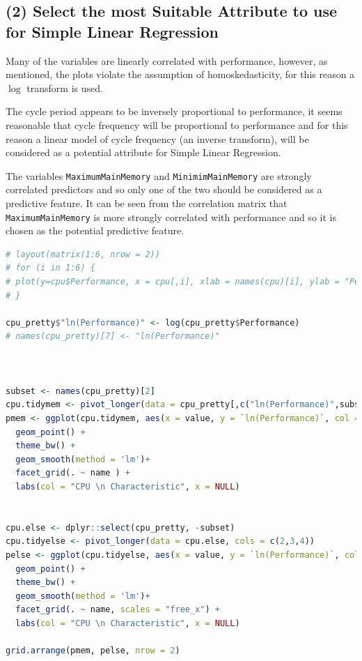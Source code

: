 \documentclass[
]{article}
\newcommand{\passthrough}[1]{#1}
\begin{document}
\hypertarget{select-the-most-suitable-attribute-to-use-for-simple-linear-regression}{%
\subsection{(2) Select the most Suitable Attribute to use for Simple
Linear
Regression}\label{select-the-most-suitable-attribute-to-use-for-simple-linear-regression}}

Many of the variables are linearly correlated with performance, however,
as mentioned, the plots violate the assumption of homoskedasticity, for
this reason a \(\log\) transform is used.

The cycle period appears to be inversely proportional to performance, it
seems reasonable that cycle frequency will be proportional to
performance and for this reason a linear model of cycle frequency
(an inverse transform), will be considered as a potential attribute for
Simple Linear Regression.

The variables \passthrough{\lstinline!MaximumMainMemory!} and
\passthrough{\lstinline!MinimimMainMemory!} are strongly correlated
predictors and so only one of the two should be considered as a
predictive feature. It can be seen from the correlation matrix that
\passthrough{\lstinline!MaximumMainMemory!} is more strongly correlated
with performance and so it is chosen as the potential predictive
feature.

\begin{lstlisting}[language=R]
# layout(matrix(1:6, nrow = 2))
# for (i in 1:6) {
# plot(y=cpu$Performance, x = cpu[,i], xlab = names(cpu)[i], ylab = "Performance")
# }

cpu_pretty$"ln(Performance)" <- log(cpu_pretty$Performance)
# names(cpu_pretty)[7] <- "ln(Performance)"



subset <- names(cpu_pretty)[2]
cpu.tidymem <- pivot_longer(data = cpu_pretty[,c("ln(Performance)",subset)], cols = subset )
pmem <- ggplot(cpu.tidymem, aes(x = value, y = `ln(Performance)`, col = name)) +
  geom_point() + 
  theme_bw() +
  geom_smooth(method = 'lm')+
  facet_grid(. ~ name ) +
  labs(col = "CPU \n Characteristic", x = NULL)


cpu.else <- dplyr::select(cpu_pretty, -subset)
cpu.tidyelse <- pivot_longer(data = cpu.else, cols = c(2,3,4))
pelse <- ggplot(cpu.tidyelse, aes(x = value, y = `ln(Performance)`, col = name)) +
  geom_point() + 
  theme_bw() +
  geom_smooth(method = 'lm')+
  facet_grid(. ~ name, scales = "free_x") + 
  labs(col = "CPU \n Characteristic", x = NULL)

grid.arrange(pmem, pelse, nrow = 2)
\end{lstlisting}
\end{document}
